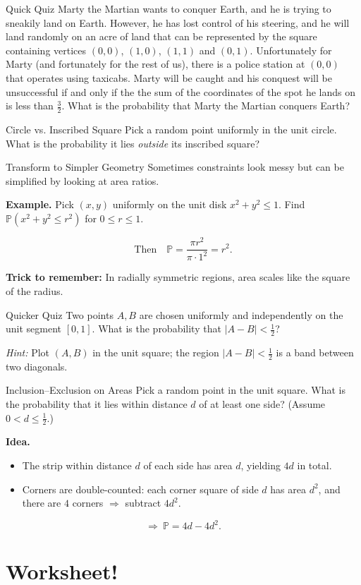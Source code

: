 \documentclass[aspectratio=169,xcolor=dvipsnames]{beamer}
\begin{document}
\begin{frame}[t]{Quick Quiz}
Marty the Martian wants to conquer Earth, and he is trying to sneakily land on Earth. However, he has lost control of his steering, and he will land randomly on an acre of land that can be represented by the square containing vertices $(0,0)$, $(1,0)$, $(1,1)$ and $(0,1)$. Unfortunately for Marty (and fortunately for the rest of us), there is a police station at $(0,0)$ that operates using taxicabs. Marty will be caught and his conquest will be unsuccessful if and only if the the sum of the coordinates of the spot he lands on is less than $\frac{3}{2}$. What is the probability that Marty the Martian conquers Earth?

\vspace{2.5cm}

\end{frame}

\begin{frame}[t]{Circle vs. Inscribed Square}
Pick a random point uniformly in the unit circle. What is the probability it lies \emph{outside} its inscribed square?
\end{frame}

\begin{frame}[t]{Transform to Simpler Geometry}
Sometimes constraints look messy but can be simplified by looking at area ratios.

\medskip
\textbf{Example.} Pick $(x,y)$ uniformly on the unit disk $x^2+y^2\le 1$. Find $\mathbb{P}(x^2+y^2 \le r^2)$ for $0\le r\le 1$.

\[
\text{Then}\quad \mathbb{P} = \frac{\pi r^2}{\pi\cdot 1^2}=r^2.
\]

\medskip
\textbf{Trick to remember:} In radially symmetric regions, area scales like the square of the radius.
\end{frame}

\begin{frame}[t]{Quicker Quiz}
Two points $A,B$ are chosen uniformly and independently on the unit segment $[0,1]$. What is the probability that $|A-B|<\tfrac{1}{2}$?

\vspace{2.2cm}

\textit{Hint:} Plot $(A,B)$ in the unit square; the region $|A-B|<\tfrac12$ is a band between two diagonals.
\end{frame}

\begin{frame}[t]{Inclusion–Exclusion on Areas}
Pick a random point in the unit square. What is the probability that it lies within distance $d$ of at least one side? (Assume $0<d\le \tfrac12$.)

\medskip
\textbf{Idea.}
\begin{itemize}
  \item The strip within distance $d$ of each side has area $d$, yielding $4d$ in total.
  \item Corners are double-counted: each corner square of side $d$ has area $d^2$, and there are $4$ corners $\Rightarrow$ subtract $4d^2$.
\end{itemize}

\[
\Rightarrow\ \mathbb{P} = 4d - 4d^2.
\]
\end{frame}

\section{Worksheet!}
\end{document}
